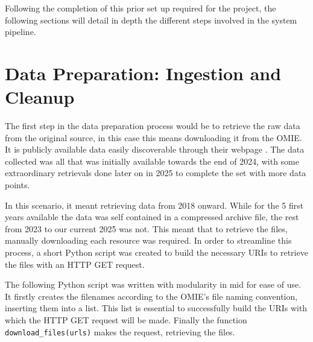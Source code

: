 \documentclass[12pt]{report} %
\begin{document}
Following the completion of this prior set up required for the project, the following sections will detail in depth the different steps involved in the system pipeline.



\section{Data Preparation: Ingestion and Cleanup}


The first step in the data preparation process would be to retrieve the raw data from the original source, in this case this means downloading it from the OMIE. It is publicly available data easily discoverable through their webpage \cite{omie_datos}. The data collected was all that was initially available towards the end of 2024, with some extraordinary retrievals done later on in 2025 to complete the set with more data points.

In this scenario, it meant retrieving data from 2018 onward. While for the 5 first years available the data was self contained in a compressed archive file, the rest from 2023 to our current 2025 was not. This meant that to retrieve the files, manually downloading each resource was required. In order to streamline this process, a short Python script was created to build the necessary URIs to retrieve the files with an HTTP GET request.

The following Python script was written with modularity in mid for ease of use. It firstly creates the filenames according to the OMIE's file naming convention, inserting them into a list. This list is essential to successfully build the URIs with which the HTTP GET request will be made. Finally the function \small{\verb|download_files(urls)|} makes the request, retrieving the files.
\end{document}
